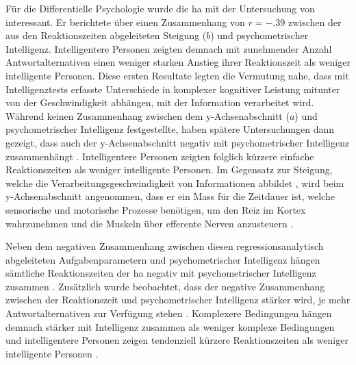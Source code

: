 \documentclass[11pt, twoside, a4paper]{book}		%
\begin{document}
Für die Differentielle Psychologie wurde die \gls{ha} mit der Untersuchung von \citet{Roth1964} interessant. Er berichtete über einen Zusammenhang von $r=-.39$ zwischen der aus den Reaktionszeiten abgeleiteten Steigung ($b$) und psychometrischer Intelligenz. Intelligentere Personen zeigten demnach mit zunehmender Anzahl Ant\-wort\-alt\-er\-na\-ti\-ven einen weniger starken Anstieg ihrer Reaktionszeit als weniger intelligente Personen. 
Diese ersten Resultate legten die Vermutung nahe, dass mit Intelligenztests erfasste Unterschiede in komplexer kognitiver Leistung mitunter von der Geschwindigkeit abhängen, mit der Information verarbeitet wird.
Während \citeauthor{Roth1964} keinen Zusammenhang zwischen dem y-Ach\-sen\-ab\-schnitt ($a$) und psychometrischer Intelligenz festgestellte, haben spätere Untersuchungen dann gezeigt, dass auch der y-Ach\-sen\-ab\-schnitt negativ mit psychometrischer Intelligenz zusammenhängt \citep[z. B.][]{Jensen1982b, Jensen1987a, Neubauer1997a, Neubauer1997b}. Intelligentere Personen zeigten folglich kürzere einfache Reaktionszeiten als weniger intelligente Personen. Im Gegensatz zur Steigung, welche die Verarbeitungsgeschwindigkeit von Informationen abbildet \citep{Jensen1998b, Roth1964}, wird beim y-Ach\-sen\-ab\-schnitt angenommen, dass er ein Mass für die Zeitdauer ist, welche sensorische und motorische Prozesse benötigen, um den Reiz im Kortex wahrzunehmen und die Muskeln über efferente Nerven anzusteuern \citep{Jensen1998b}.

Neben dem negativen Zusammenhang zwischen diesen regressionsanalytisch abgeleiteten Aufgabenparametern und psychometrischer Intelligenz hängen sämtliche  Reaktionszeiten der \gls{ha} negativ mit psychometrischer Intelligenz zusammen \citep[$r=-.22$ bis $-.40$;][]{Sheppard2008}. Zusätzlich wurde beobachtet, dass der negative Zusammenhang zwischen der Reaktionszeit und psychometrischer Intelligenz stärker wird, je mehr Antwortalternativen zur Verfügung stehen \citep{Vernon1984}. Komplexere Bedingungen hängen demnach stärker mit Intelligenz zusammen als weniger komplexe Bedingungen und intelligentere Personen zeigen tendenziell kürzere Reaktionszeiten als weniger intelligente Personen \citep{Sheppard2008}.
\end{document}
